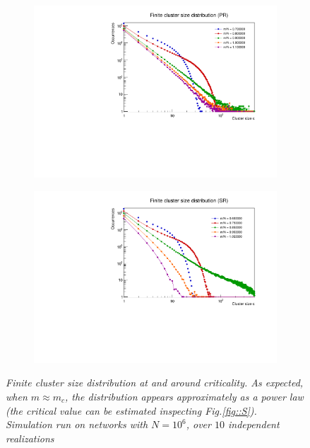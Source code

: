 \begin{figure}
	\begin{subfigure}[b]{0.45\linewidth}
		\includegraphics[width=\linewidth]{images/ClusterDistrPR.pdf}
	\end{subfigure}
	\hspace{0.5em}
	\begin{subfigure}[b]{0.45\linewidth}
		\includegraphics[width=\linewidth]{images/ClusterDistrSR.pdf}
	\end{subfigure}
	\caption{\textit{Finite cluster size distribution at and around criticality. As expected, when $m \approx m_c$, the distribution appears approximately as a power law (the critical value can be estimated inspecting Fig.\ref{fig::S}). Simulation run on networks with $N = 10^6$, over $10$ independent realizations}}
	\label{fig:ClusterDistr}
\end{figure}

